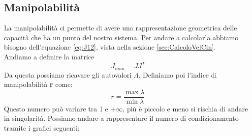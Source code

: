 \subsection{Manipolabilità}
La manipolabilità ci permette di avere una rappresentazione geometrica delle capacità che ha un punto del nostro sistema. Per andare a calcolarla abbiamo bisogno dell'equazione \ref{eq:J12}, vista nella sezione \ref{sec:CalcoloVelCin}.
\\Andiamo a definire la matrice
\begin{equation}
    J_{man} = JJ^T
\end{equation}
Da questa possiamo ricavare gli autovalori $\Lambda$. Definiamo poi  l'indice di manipolabilità \textbf{r} come:
\begin{equation}
    r = \frac{\max\lambda}{\min\lambda}
\end{equation}
Questo numero può variare tra 1 e $+\infty$, più è piccolo e meno si rischia di andare in singolarità. Possiamo andare a rappresentare il numero di condizionamento tramite i grafici seguenti: 
